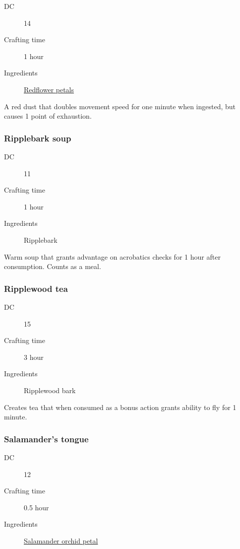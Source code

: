 \begin{description}
\item [DC] 14
\item [Crafting time] 1 hour
\item [Ingredients] \hyperref[Redflower]{Redflower petals}
\end{description}

A red dust that doubles movement speed for one minute when ingested, but causes 1 point of exhaustion.

\subsubsection{Ripplebark soup}

\begin{description}
\item [DC] 11
\item [Crafting time] 1 hour
\item [Ingredients] Ripplebark
\end{description}

Warm soup that grants advantage on acrobatics checks for 1 hour after consumption. Counts as a meal.

\subsubsection{Ripplewood tea}
\label{Ripplewood tea}

\begin{description}
\item [DC] 15
\item [Crafting time] 3 hour
\item [Ingredients] Ripplewood bark
\end{description}

Creates tea that when consumed as a bonus action grants ability to fly for 1 minute.

\subsubsection{Salamander's tongue}
\label{Salamander's tongue}

\begin{description}
\item [DC] 12
\item [Crafting time] 0.5 hour
\item [Ingredients] \hyperref[Salamander Orchid]{Salamander orchid petal}
\end{description}

